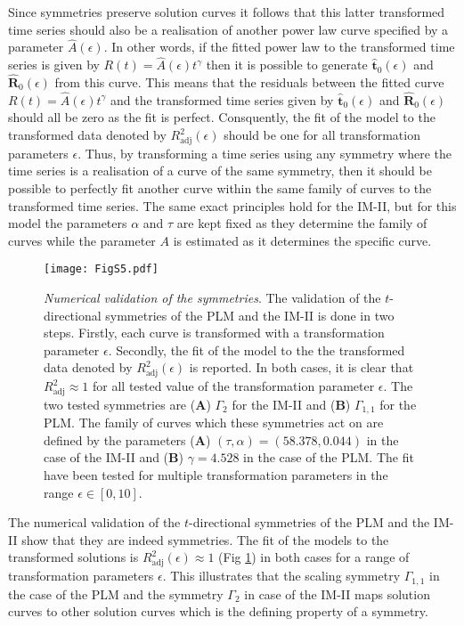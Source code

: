 Since symmetries preserve solution curves it follows that this latter transformed time series should also be a realisation of another power law curve specified by a parameter $\hat{A}(\epsilon)$. In other words, if the fitted power law to the transformed time series is given by $R(t)=\hat{A}(\epsilon)t^{\gamma}$ then it is possible to generate $\mathbf{\hat{t}}_0(\epsilon)$ and $\mathbf{\hat{R}}_0(\epsilon)$ from this curve. This means that the residuals between the fitted curve $R(t)=\hat{A}(\epsilon)t^{\gamma}$ and the transformed time series given by $\mathbf{\hat{t}}_0(\epsilon)$ and $\mathbf{\hat{R}}_0(\epsilon)$ should all be zero as the fit is perfect. Consquently, the fit of the model to the transformed data denoted by $R^2_{\mathrm{adj}}(\epsilon)$ should be one for all transformation parameters $\epsilon$. Thus, by transforming a time series using any symmetry where the time series is a realisation of a curve of the same symmetry, then it should be possible to perfectly fit another curve within the same family of curves to the transformed time series. The same exact principles hold for the IM-II, but for this model the parameters $\alpha$ and $\tau$ are kept fixed as they determine the family of curves while the parameter $A$ is estimated as it determines the specific curve.

   





\begin{figure}[htbp!]
  \texttt{[image: FigS5.pdf]}
  \caption[Numerical validation of the symmetries]{\textit{Numerical validation of the symmetries}. The validation of the $t$-directional symmetries of the PLM and the IM-II is done in two steps. Firstly, each curve is transformed with a transformation parameter $\epsilon$. Secondly, the fit of the model to the the transformed data denoted by $R^2_{\mathrm{adj}}(\epsilon)$ is reported. In both cases, it is clear that $R^2_{\mathrm{adj}}\approx 1$ for all tested value of the transformation parameter $\epsilon$. The two tested symmetries are (\textbf{A}) $\Gamma_2$ for the IM-II and (\textbf{B}) $\Gamma_{1,1}$ for the PLM. The family of curves which these symmetries act on are defined by the parameters (\textbf{A}) $(\tau,\alpha)=(58.378,0.044)$ in the case of the IM-II and (\textbf{B}) $\gamma=4.528$ in the case of the PLM. The fit have been tested for multiple transformation parameters in the range $\epsilon\in [0,10]$. } 
  \label{fig:numerical_validation}
  \end{figure}



  The numerical validation of the $t$-directional symmetries of the PLM and the IM-II show that they are indeed symmetries. The fit of the models to the transformed solutions is $R^{2}_{\mathrm{adj}}(\epsilon)\approx 1$ (Fig \ref{fig:numerical_validation}) in both cases for a range of transformation parameters $\epsilon$. This illustrates that the scaling symmetry $\Gamma_{1,1}$ in the case of the PLM and the symmetry $\Gamma_{2}$ in case of the IM-II maps solution curves to other solution curves which is the defining property of a symmetry. 
